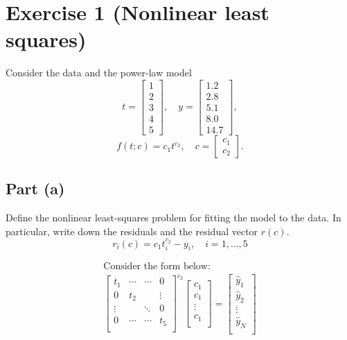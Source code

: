 

\maketitle
\section*{Exercise 1 (Nonlinear least squares)}
Consider the data and the power-law model
\[
	t = \begin{bmatrix} 1 \\ 2 \\ 3 \\ 4 \\ 5 \end{bmatrix}, \quad
	y = \begin{bmatrix} 1.2 \\ 2.8 \\ 5.1 \\ 8.0 \\ 14.7 \end{bmatrix},
\]
\[ f(t; c) = c_1 t^{c_2}, \quad c = \begin{bmatrix} c_1 \\ c_2 \end{bmatrix}. \]

\subsection*{Part (a)}
Define the nonlinear least-squares problem for fitting the model to the data. In particular, write down the residuals and the residual vector $r(c)$.
\[ r_i(c) = c_1 t_i^{c_2} - y_i, \quad i = 1, \dots, 5 \]

\[
	\begin{gathered}
		\text{Consider the form below: } \\
		\begin{bmatrix}
			t_1    & \cdots & \cdots & 0      \\
			0      & t_2    &        & \vdots \\
			\vdots &        & \ddots & 0      \\
			0      & \cdots & \cdots & t_5    \\
		\end{bmatrix}^{c_2}
		\begin{bmatrix}
			c_1    \\
			c_1    \\
			\vdots \\
			c_1    \\
		\end{bmatrix} =
		\begin{bmatrix}
			\hat{y}_1 \\
			\hat{y}_2 \\
			\vdots    \\
			\hat{y}_N \\
		\end{bmatrix}
	\end{gathered}
\]

